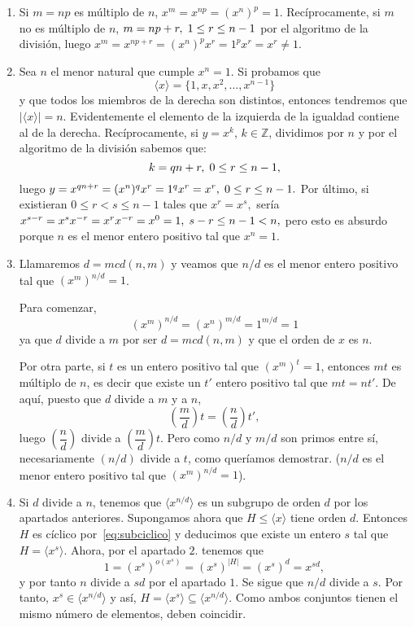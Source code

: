 \documentclass[12pt]{article}
\begin{document}
\begin{enumerate}
\item Si $m = np$ es múltiplo de $n$, $x^{m} = x^{np} = (x^{n})^{p} = 1.$ Recíprocamente, si $m$ no es múltiplo de $n$, $m = np + r, \hspace{0.1cm} 1\leq r\leq n-1$ por el algoritmo de la división, luego $x^{m} = x^{np + r} = (x^{n})^{p}x^{r} = 1^{p}x^{r} = x^{r} \neq 1$.
\item Sea $n$ el menor natural que cumple $x^{n} = 1$. Si probamos que $$\langle x \rangle = \lbrace 1, x,x^2, \ldots, x^{n-1} \rbrace$$ y que todos los miembros de la derecha son distintos, entonces tendremos que $| \langle x\rangle | = n$.
Evidentemente el elemento de la izquierda de la igualdad contiene al de la derecha. Recíprocamente, si $y = x^{k}$, $k \in \mathbb{Z}$, dividimos por $n$ y por el algoritmo de la división sabemos que: $$k = qn + r, \hspace{0.1cm} 0\leq r \leq n-1,$$ luego $y = x^{qn+r}= (x^{n})^{q}x^{r} = 1^{q}x^{r} = x^{r}, \hspace{0.1cm}  0\leq r \leq n-1.$ Por último, si existieran $0\leq r < s \leq n-1$ tales que $x^{r} = x^{s},$ sería $x^{s-r} = x^{s}x^{-r} = x^{r}x^{-r} = x^{0} = 1, \hspace{0.1cm} s-r \leq n-1 < n,$ pero esto es absurdo porque $n$ es el menor entero positivo tal que $x^{n} = 1$.
\item Llamaremos $d = mcd(n,m)$ y veamos que $n/d$ es el menor entero positivo tal que $(x^{m})^{n/d} = 1$.

Para comenzar, $$(x^{m})^{n/d} = (x^{n})^{m/d} = 1^{m/d} = 1$$ ya que $d$ divide a $m$ por ser $d = mcd(n,m)$ y que el orden de $x$ es $n$.

Por otra parte, si $t$ es un entero positivo tal que $(x^{m})^{t} = 1$, entonces $mt$ es múltiplo de $n$, es decir que existe un $t'$ entero positivo tal que $mt = nt'$. De aquí, puesto que $d$ divide a $m$  y a $n$, $$\left( \dfrac{m}{d}\right)t =\left( \dfrac{n}{d}\right) t',$$ luego $\left( \dfrac{n}{d}\right) $ divide a $\left( \dfrac{m}{d}\right) t$. Pero como $n/d$ y $m/d$ son primos entre sí, necesariamente $(n/d)$ divide a $t$, como queríamos demostrar. ($n/d$ es el menor entero positivo tal que $(x^{m})^{n/d} = 1$).
\item Si $d$ divide a $n$, tenemos que $\langle x^{n/d} \rangle$ es un subgrupo de orden $d$ por los apartados anteriores. Supongamos ahora que $H \leq \langle x \rangle $ tiene orden $d$. Entonces $H$ es cíclico por~\ref{eq:subciclico} y deducimos que existe un entero $s$ tal que $H = \langle x^s \rangle$. Ahora, por el apartado $2.$ tenemos que $$1 = (x^s)^{o(x^s)} = (x^s)^{|H|} = (x^s)^d = x^{sd},$$ y por tanto $n$ divide a $sd$ por el apartado $1.$ Se sigue que $n/d$ divide a $s$. Por tanto, $x^s \in \langle x^{n/d} \rangle$ y así, $H = \langle x^s \rangle \subseteq \langle x^{n/d} \rangle$. Como ambos conjuntos tienen el mismo número de elementos, deben coincidir.
\end{enumerate}
\end{document}
